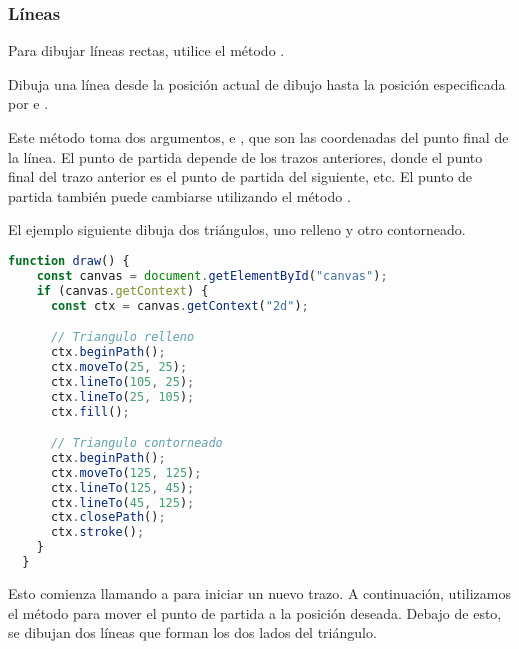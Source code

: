 \subsubsection{Líneas}

Para dibujar líneas rectas, utilice el método .

\begin{description}
	 Dibuja una línea desde la posición actual de dibujo hasta la posición especificada por  e .
\end{description}
\vspace{0.5cm} %

Este método toma dos argumentos,  e , que son las coordenadas del punto final de la línea. El punto de partida depende de los trazos anteriores, donde el punto final del trazo anterior es el punto de partida del siguiente, etc. El punto de partida también puede cambiarse utilizando el método .

\newpage %
El ejemplo siguiente dibuja dos triángulos, uno relleno y otro contorneado.

\vspace{0.5cm} %
\begin{lstlisting}[language=TypeScript, style=mystyle]
  function draw() {
    const canvas = document.getElementById("canvas");
    if (canvas.getContext) {
      const ctx = canvas.getContext("2d");

      // Triangulo relleno
      ctx.beginPath();
      ctx.moveTo(25, 25);
      ctx.lineTo(105, 25);
      ctx.lineTo(25, 105);
      ctx.fill();

      // Triangulo contorneado
      ctx.beginPath();
      ctx.moveTo(125, 125);
      ctx.lineTo(125, 45);
      ctx.lineTo(45, 125);
      ctx.closePath();
      ctx.stroke();
    }
  }
\end{lstlisting}
\vspace{0.5cm} %

Esto comienza llamando a  para iniciar un nuevo trazo. A continuación, utilizamos el método  para mover el punto de partida a la posición deseada. Debajo de esto, se dibujan dos líneas que forman los dos lados del triángulo.

\vspace{0.5cm} %
\begin{center}
\end{center}
\vspace{0.5cm} %

